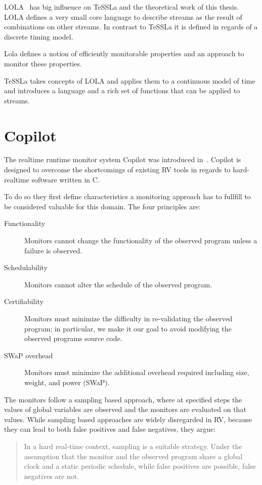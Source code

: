LOLA~\cite{DAngelo2005} has big influence on TeSSLa and the theoretical work of this thesis.
LOLA defines a very small core language to describe streams as the result of combinations on other streams.
In contrast to TeSSLa it is defined in regards of a discrete timing model.

Lola defines a notion of efficiently monitorable properties and an approach to monitor these properties.

TeSSLa takes concepts of LOLA and applies them to a continuous model of time and introduces a language and a rich
set of functions that can be applied to streams.

\section{Copilot}
\label{sec:related:copilot}

The realtime runtime monitor system Copilot was introduced in~\cite{Pike2010}.
Copilot is designed to overcome the shortcomings of existing RV tools in regards to hard-realtime software written in C.

To do so they first define characteristics a monitoring approach has to fullfill to be considered valuable for this domain.
The four principles are:

\begin{description}
  \item[Functionality] Monitors cannot change the functionality of the observed program unless a failure is observed.
  \item[Schedulability] Monitors cannot alter the schedule of the observed program.
  \item[Certifiability] Monitors must minimize the difficulty in re-validating the observed program; in particular, we make it our goal to avoid modifying the observed programs source code.
  \item[SWaP overhead] Monitors must minimize the additional overhead required including size, weight, and power (SWaP).
\end{description}

The monitors follow a sampling based approach, where at specified steps the values of global variables are observed and the monitors are evaluated
on that values.
While sampling based approaches are widely disregarded in RV, because they can lead to both false positives and false negatives,
they argue:

\begin{quote}
  In a hard real-time context, sampling is a suitable strategy. Under
  the assumption that the monitor and the observed program share a global clock and a static periodic schedule, while false positives are possible, false negatives are not.~\cite{Pike2010}
\end{quote}

